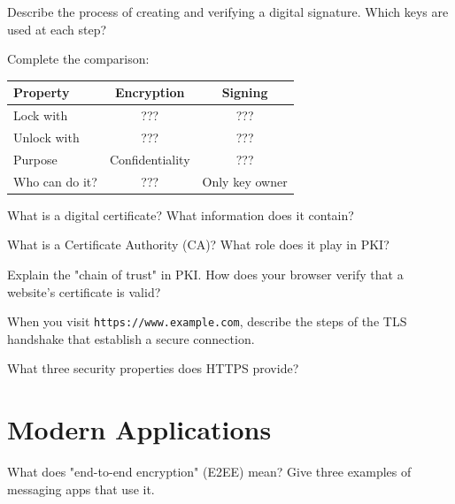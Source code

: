 \documentclass[11pt,a4paper]{report}
\begin{document}
\begin{ex}
Describe the process of creating and verifying a digital signature. Which keys are used at each step?
\end{ex}

\begin{ex}
Complete the comparison:

\begin{center}
\begin{tabular}{|l|c|c|}
\hline
\textbf{Property} & \textbf{Encryption} & \textbf{Signing} \\
\hline
Lock with & ??? & ??? \\
Unlock with & ??? & ??? \\
Purpose & Confidentiality & ??? \\
Who can do it? & ??? & Only key owner \\
\hline
\end{tabular}
\end{center}
\end{ex}

\begin{ex}
What is a digital certificate? What information does it contain?
\end{ex}

\begin{ex}
What is a Certificate Authority (CA)? What role does it play in PKI?
\end{ex}

\begin{ex}
Explain the "chain of trust" in PKI. How does your browser verify that a website's certificate is valid?
\end{ex}

\begin{ex}
When you visit \texttt{https://www.example.com}, describe the steps of the TLS handshake that establish a secure connection.
\end{ex}

\begin{ex}
What three security properties does HTTPS provide?
\end{ex}

\section{Modern Applications}

\begin{ex}
What does "end-to-end encryption" (E2EE) mean? Give three examples of messaging apps that use it.
\end{ex}
\end{document}
